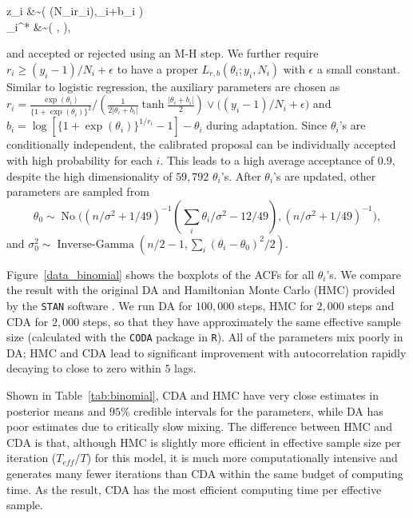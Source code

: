 \documentclass[12pt]{article}
\newcommand{\be}{\begin{equs}}
\newcommand{\ee}{\end{equs}}
\DeclareMathOperator{\No}{No}
\DeclareMathOperator{\PG}{PG}
\DeclareMathOperator{\IG}{Inverse-Gamma}
\begin{document}
\be
z_i &\sim \PG\left ( (N_ir_i),\theta_i+b_i \right)\\
\theta_i^* &\sim \No \left( , \right),
\ee
and accepted or rejected using an M-H step. We further require $r_i \ge (y_i-1)/N_i + \epsilon$ to have a proper $L_{r,b}(\theta_i;y_i, N_i)$ with $\epsilon$ a small constant. Similar to logistic regression, the auxiliary parameters are chosen as $r_i =\frac{\exp(\theta_i)}{ \{1+\exp(\theta_i)\} ^2} / \left (   \frac{1}{2 |\theta_i+b_i|} \tanh\frac{|\theta_i+b_i|}{2} \right) \vee \big ( (y_i-1)/N_i + \epsilon \big)$ and $b_i=\log[  \{1+\exp(\theta_i)\}^{1/r_i} -1] - \theta_i$ during adaptation. Since $\theta_i$'s are conditionally independent, the calibrated proposal can be individually accepted with high probability for each $i$. This leads to a high average acceptance of $0.9$, despite the high dimensionality of $59,792$ $\theta_i$'s.
After $\theta_i$'s are updated, other parameters are sampled from 
$$\theta_0 \sim \No\big( (n/\sigma^2 +1/49)^{-1} (\sum_i \theta_i /\sigma^2  -12/49 ),  (n /\sigma^2 +1/49)^{-1} \big),$$ and $\sigma^2_0 \sim \IG( n/2-1, \sum_i (\theta_i -\theta_0)^2 /2)$.

Figure~\ref{data_binomial} shows the boxplots of the ACFs for all $\theta_i$'s. We compare the result with the original DA \citep{polson2013bayesian} and Hamiltonian Monte Carlo (HMC) provided by the \texttt{STAN} software \citep{carpenter2016stan}. We run DA for $100,000$ steps, HMC for $2,000$ steps and CDA for $2,000$ steps, so that they have approximately the same effective sample size (calculated with the \texttt{CODA} package in \texttt{R}). All of the parameters mix poorly in DA; HMC and CDA lead to significant improvement with autocorrelation rapidly decaying to close to zero within $5$ lags.

Shown in Table~\ref{tab:binomial}, CDA and HMC have very close estimates in posterior means and $95\%$ credible intervals for the parameters, while DA has poor estimates due to critically slow mixing. The difference between HMC and CDA is that, although HMC is slightly more efficient in effective sample size per iteration ($T_{eff}/T$) for this model, it is much more computationally intensive and generates many fewer iterations than CDA within the same budget of computing time. As the result, CDA has the most efficient computing time per effective sample.  
\end{document}

